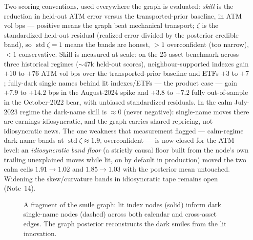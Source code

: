 \documentclass[11pt]{article}
\begin{document}
Two scoring conventions, used everywhere the graph is evaluated: \emph{skill}
is the reduction in held-out ATM error versus the transported-prior baseline,
in ATM vol bps --- positive means the graph beat mechanical transport; $\zeta$
is the standardized held-out residual (realized error divided by the posterior
credible band), so $\operatorname{std}\zeta=1$ means the bands are honest,
$>1$ overconfident (too narrow), $<1$ conservative. Skill is measured at
scale: on the 25-asset benchmark across three historical regimes ($\sim$47k
held-out scores), neighbour-supported indexes gain $+10$ to $+76$ ATM vol bps
over the transported-prior baseline and ETFs $+3$ to $+7$; fully-dark single
names behind lit indexes/ETFs --- the product case --- gain $+7.9$ to $+14.2$
bps in the August-2024 spike and $+3.8$ to $+7.2$ fully out-of-sample in the
October-2022 bear, with unbiased standardized residuals. In the calm July-2023
regime the dark-name skill is $\approx0$ (never negative): single-name moves
there are earnings-idiosyncratic, and the graph carries shared repricing, not
idiosyncratic news. The one weakness that measurement flagged --- calm-regime
dark-name bands at $\operatorname{std}\zeta\approx1.9$, overconfident --- is
now closed for the ATM level: an \emph{idiosyncratic band floor} (a strictly
causal floor built from the node's own trailing unexplained moves while lit,
on by default in production) moved the two calm cells $1.91\to1.02$ and
$1.85\to1.03$ with the posterior mean untouched. Widening the skew/curvature
bands in idiosyncratic tape remains open (Note~14).

\begin{figure}[H]
\centering
{}
\caption{A fragment of the smile graph: lit index nodes (solid) inform dark
single-name nodes (dashed) across both calendar and cross-asset edges. The graph
posterior reconstructs the dark smiles from the lit innovation.}
\label{fig:smilegraph}
\end{figure}
\end{document}
